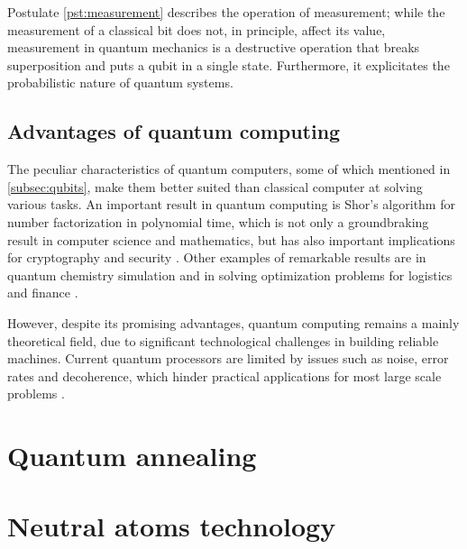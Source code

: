 Postulate \ref{pst:measurement} describes the operation of measurement; while the measurement of a classical bit does not, in principle, affect its value, measurement in quantum mechanics is a destructive operation that breaks superposition and puts a qubit in a single state. Furthermore, it explicitates the probabilistic nature of quantum systems.

\subsection{Advantages of quantum computing}
The peculiar characteristics of quantum computers, some of which mentioned in \ref{subsec:qubits}, make them better suited than classical computer at solving various tasks. An important result in quantum computing is Shor's algorithm for number factorization in polynomial time, which is not only a groundbraking result in computer science and mathematics, but has also important implications for cryptography and security \cite{Shor1997}. Other examples of remarkable results are in quantum chemistry simulation \cite{Kassal2011} and in solving optimization problems for logistics and finance \cite{Farhi2014}. 

However, despite its promising advantages, quantum computing remains a mainly theoretical field, due to significant technological challenges in building reliable machines. Current quantum processors are limited by issues such as noise, error rates and decoherence, which hinder practical applications for most large scale problems \cite{Preskill2018}.

\section{Quantum annealing}

\section{Neutral atoms technology}